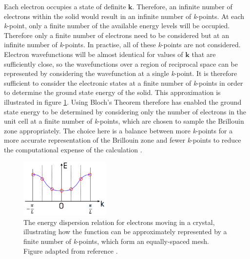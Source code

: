 Each electron occupies a state of definite $\mathbf{k}$. Therefore, an infinite number of electrons within the solid would result in an infinite number of \textit{k}-points. At each \textit{k}-point, only a finite number of the available energy levels will be occupied. Therefore only a finite number of electrons need to be considered but at an infinite number of \textit{k}-points. In practise, all of these \textit{k}-points are not considered. 
Electron wavefunctions will be almost identical for values of $\mathbf{k}$ that are sufficiently close, so the wavefunctions over a region of reciprocal space can be represented by considering the wavefunction at a single \textit{k}-point. It is therefore sufficient to consider the electronic states at a finite number of \textit{k}-points in order to determine the ground state energy of the solid. This approximation is illustrated in figure \ref{energy_dispersion}. Using Bloch's Theorem therefore has enabled the ground state energy to be determined by considering only the number of electrons in the unit cell at a finite number of \textit{k}-points, which are chosen to sample the Brillouin zone appropriately. The choice here is a balance between more \textit{k}-points for a more accurate representation of the Brillouin zone and fewer \textit{k}-points to reduce the computational expense of the calculation \cite{bloch-thesis}.

\begin{figure}[h!]
  \centering
    \includegraphics[width=0.4\textwidth]{figures/energy_dispersion.png}
    \caption{The energy dispersion relation for electrons moving in a crystal, illustrating how the function can be approximately represented by a finite number of \textit{k}-points, which form an equally-spaced mesh. Figure adapted from reference .}
  \label{energy_dispersion}
\end{figure}

